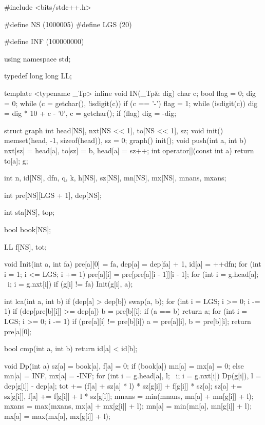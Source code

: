 \begin{cppcode}
#include <bits/stdc++.h>

#define NS (1000005)
#define LGS (20)

#define INF (100000000)

using namespace std;

typedef long long LL;

template <typename _Tp>
inline void IN(_Tp& dig) {
  char c;
  bool flag = 0;
  dig = 0;
  while (c = getchar(), !isdigit(c))
    if (c == '-') flag = 1;
  while (isdigit(c)) dig = dig * 10 + c - '0', c = getchar();
  if (flag) dig = -dig;
}

struct graph {
  int head[NS], nxt[NS << 1], to[NS << 1], sz;
  void init() { memset(head, -1, sizeof(head)), sz = 0; }
  graph() { init(); }
  void push(int a, int b) { nxt[sz] = head[a], to[sz] = b, head[a] = sz++; }
  int operator[](const int a) { return to[a]; }
} g;

int n, id[NS], dfn, q, k, h[NS], sz[NS], mn[NS], mx[NS], mnans, mxans;

int pre[NS][LGS + 1], dep[NS];

int sta[NS], top;

bool book[NS];

LL f[NS], tot;

void Init(int a, int fa) {
  pre[a][0] = fa, dep[a] = dep[fa] + 1, id[a] = ++dfn;
  for (int i = 1; i <= LGS; i += 1) pre[a][i] = pre[pre[a][i - 1]][i - 1];
  for (int i = g.head[a]; ~i; i = g.nxt[i])
    if (g[i] != fa) Init(g[i], a);
}

int lca(int a, int b) {
  if (dep[a] > dep[b]) swap(a, b);
  for (int i = LGS; i >= 0; i -= 1)
    if (dep[pre[b][i]] >= dep[a]) b = pre[b][i];
  if (a == b) return a;
  for (int i = LGS; i >= 0; i -= 1)
    if (pre[a][i] != pre[b][i]) a = pre[a][i], b = pre[b][i];
  return pre[a][0];
}

bool cmp(int a, int b) { return id[a] < id[b]; }

void Dp(int a) {
  sz[a] = book[a], f[a] = 0;
  if (book[a])
    mn[a] = mx[a] = 0;
  else
    mn[a] = INF, mx[a] = -INF;
  for (int i = g.head[a], l; ~i; i = g.nxt[i]) {
    Dp(g[i]), l = dep[g[i]] - dep[a];
    tot += (f[a] + sz[a] * l) * sz[g[i]] + f[g[i]] * sz[a];
    sz[a] += sz[g[i]], f[a] += f[g[i]] + l * sz[g[i]];
    mnans = min(mnans, mn[a] + mn[g[i]] + l);
    mxans = max(mxans, mx[a] + mx[g[i]] + l);
    mn[a] = min(mn[a], mn[g[i]] + l);
    mx[a] = max(mx[a], mx[g[i]] + l);
  }
}


\end{cppcode}
